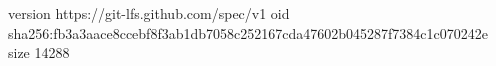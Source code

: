 version https://git-lfs.github.com/spec/v1
oid sha256:fb3a3aace8ccebf8f3ab1db7058c252167cda47602b045287f7384c1c070242e
size 14288
